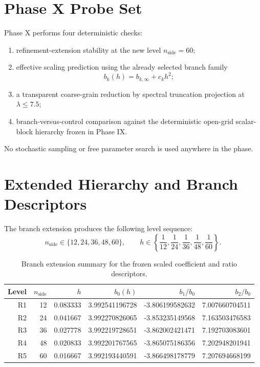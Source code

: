\documentclass[11pt]{article}
\begin{document}
\section{Phase X Probe Set}

Phase X performs four deterministic checks:
\begin{enumerate}
\item refinement-extension stability at the new level $n_{\mathrm{side}} = 60$;
\item effective scaling prediction using the already selected branch family
\[
b_k(h) = b_{k,\infty} + c_k h^2;
\]
\item a transparent coarse-grain reduction by spectral truncation projection at $\lambda \le 7.5$;
\item branch-versus-control comparison against the deterministic open-grid scalar-block hierarchy frozen in Phase IX.
\end{enumerate}

No stochastic sampling or free parameter search is used anywhere in the phase.

\section{Extended Hierarchy and Branch Descriptors}

The branch extension produces the following level sequence:
\[
n_{\mathrm{side}} \in \{12,24,36,48,60\}, \qquad
h \in \left\{\frac{1}{12}, \frac{1}{24}, \frac{1}{36}, \frac{1}{48}, \frac{1}{60}\right\}.
\]

\begin{table}[t]
\centering
\small
\begin{tabular}{@{}rrrrrr@{}}
\toprule
Level & $n_{\mathrm{side}}$ & $h$ & $b_0(h)$ & $b_1/b_0$ & $b_2/b_0$ \\
\midrule
R1 & 12 & 0.083333 & 3.992541196728 & -3.806199582632 & 7.007660704511 \\
R2 & 24 & 0.041667 & 3.992270826065 & -3.853235149568 & 7.163503476583 \\
R3 & 36 & 0.027778 & 3.992219728651 & -3.862002421471 & 7.192703083601 \\
R4 & 48 & 0.020833 & 3.992201767565 & -3.865075186356 & 7.202948201941 \\
R5 & 60 & 0.016667 & 3.992193440591 & -3.866498178779 & 7.207694668199 \\
\bottomrule
\end{tabular}
\caption{Branch extension summary for the frozen scaled coefficient and ratio descriptors.}
\label{tab:branch_descriptors}
\end{table}
\end{document}
